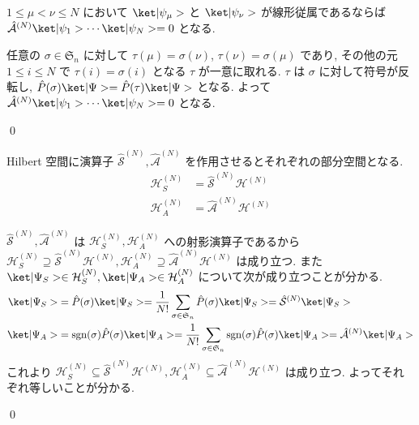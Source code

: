 \documentclass[uplatex,dvipdfmx,a4paper,11pt]{jlreq}
\makeatletter
\DeclareMathOperator{\sgn}{sgn}
\newcommand{\HH}{\mathcal{H}}
\renewcommand{\SS}{\mathfrak{S}}
\renewcommand{\S}{\mathcal{S}}
\newcommand{\A}{\mathcal{A}}
\numberwithin{equation}{section}
\theoremstyle{definition}
\renewenvironment{proof}[1][\proofname]{\par
  \normalfont
  \topsep6\p@\@plus6\p@ \trivlist
  \item[\hskip\labelsep{\bfseries #1}\@addpunct{\bfseries}]\ignorespaces\quad\par
}{
  \qed\endtrivlist\@endpefalse
}
\renewcommand\proofname{証明}
\makeatother
\begin{document}
\begin{theorem}[Q21-15(i)(ii)]
  $1\leq\mu<\nu\leq N$ において $\ket|\psi_\mu>$ と $\ket|\psi_\nu>$ が線形従属であるならば $\hat{\A}^{(N)}\ket|\psi_1>\cdots\ket|\psi_N> = 0$ となる.
\end{theorem}
\begin{proof}
  任意の $\sigma\in\SS_n$ に対して $\tau(\mu) = \sigma(\nu)$, $\tau(\nu) = \sigma(\mu)$ であり, その他の元 $1\leq i\leq N$ で $\tau(i) = \sigma(i)$ となる $\tau$ が一意に取れる. $\tau$ は $\sigma$ に対して符号が反転し, $\hat{P}(\sigma)\ket|\Psi> = \hat{P}(\tau)\ket|\Psi>$ となる. よって $\hat{\A}^{(N)}\ket|\psi_1>\cdots\ket|\psi_N> = 0$ となる.
\end{proof}

\begin{lemma}
  Hilbert 空間に演算子 $\hat{\S}^{(N)}, \hat{\A}^{(N)}$ を作用させるとそれぞれの部分空間となる.
  \begin{align}
    \HH_S^{(N)} & = \hat{\S}^{(N)}\HH^{(N)} \\
    \HH_A^{(N)} & = \hat{\A}^{(N)}\HH^{(N)}
  \end{align}
  \label{hilbert corespondence}
\end{lemma}
\begin{proof}
  $\hat{\S}^{(N)}, \hat{\A}^{(N)}$ は $\HH_S^{(N)}, \HH_A^{(N)}$ への射影演算子であるから $\HH_S^{(N)} \supseteq \hat{\S}^{(N)}\HH^{(N)}, \HH_A^{(N)} \supseteq \hat{\A}^{(N)}\HH^{(N)}$ は成り立つ.
  また $\ket|\Psi_S>\in\HH_S^{(N)}, \ket|\Psi_A>\in\HH_A^{(N)}$ について次が成り立つことが分かる.
  \begin{align}
    \ket|\Psi_S> & = \hat{P}(\sigma)\ket|\Psi_S> = \frac{1}{N!}\sum_{\sigma\in\SS_n}\hat{P}(\sigma)\ket|\Psi_S> = \hat{\S}^{(N)}\ket|\Psi_S>                         \\
    \ket|\Psi_A> & = \sgn(\sigma)\hat{P}(\sigma)\ket|\Psi_A> = \frac{1}{N!}\sum_{\sigma\in\SS_n}\sgn(\sigma)\hat{P}(\sigma)\ket|\Psi_A> = \hat{\A}^{(N)}\ket|\Psi_A>
  \end{align}
  これより $\HH_S^{(N)} \subseteq \hat{\S}^{(N)}\HH^{(N)}, \HH_A^{(N)} \subseteq \hat{\A}^{(N)}\HH^{(N)}$ は成り立つ. よってそれぞれ等しいことが分かる.
\end{proof}
\end{document}

